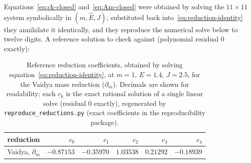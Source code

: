 \documentclass[12pt]{iopart}
\newcommand{\Ehat}{\hat E}
\theoremstyle{plain}
\theoremstyle{definition}
\theoremstyle{plain}
\theoremstyle{remark}
\begin{document}
Equations~\eqref{eq:ck-closed} and~\eqref{eq:Am-closed} were obtained by solving the
$11\times11$ system symbolically in $(m,\Ehat,J)$; substituted back
into~\eqref{eq:reduction-identity} they annihilate it identically, and they reproduce the
numerical solve below to twelve digits.
A reference solution to check against (polynomial residual $0$ exactly):
\begin{table}[htbp]
    \centering
    \caption{Reference reduction coefficients, obtained by solving
    equation~\eqref{eq:reduction-identity}, at $m{=}1$, $E{=}1.4$, $J{=}2.5$, for the Vaidya
    mass reduction ($\partial_m$). Decimals are shown for readability; each $c_k$ is the
    exact rational solution of a single linear solve (residual $0$ exactly), regenerated
    by \texttt{reproduce\_reductions.py} (exact coefficients in the reproducibility
    package).}
    \label{tab:reduction-ck}
    \small
    \begin{tabular}{lrrrrr}
        \hline\hline
        reduction & $c_0$ & $c_1$ & $c_2$ & $c_3$ & $c_4$\\
        \hline
        Vaidya, $\partial_m$ & $-0.87153$ & $-0.35970$ & $1.03538$ & $0.21292$ & $-0.18939$\\
        \hline\hline
    \end{tabular}
\end{table}
\end{document}
